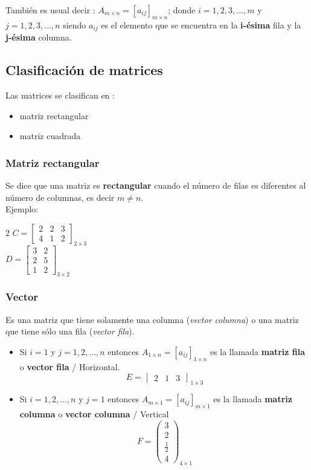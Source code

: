 \documentclass[12pt, a5paper]{article}
\begin{document}
\noindent También es usual decir : {\large $A_{m \times n} = [a_{ij}]_{m \times n}$}; donde $i = 1, 2, 3, \ldots, m$ y $j = 1, 2, 3, \ldots, n$ siendo {\Large $a_{ij}$} es el elemento que se encuentra en la \textbf{i-ésima} fila y la \textbf{j-ésima} columna.

\subsection*{Clasificación de matrices}
\noindent Las matrices se clasifican en : 
\begin{itemize}
\item{matriz rectangular}
\item{matriz cuadrada}
\end{itemize}

\subsubsection*{Matriz rectangular}
\noindent Se dice que una matriz es \textbf{rectangular} cuando el número de filas es diferentes al número de columnas, es decir $m \neq n$. \\

\noindent Ejemplo:

\begin{multicols}{2}
$C = \begin{bmatrix}
2 & 2 & 3 \\
4 & 1 & 2
\end{bmatrix}_{2 \times 3}$ \\

$D = \begin{bmatrix}
3 & 2 \\
2 & 5 \\
1 & 2
\end{bmatrix}_{3 \times 2}$
\end{multicols}

\subsubsection*{Vector}
\noindent Es una matriz que tiene solamente una columna (\textit{vector columna}) o una matriz que tiene sólo una fila (\textit{vector fila}).
\begin{itemize}
\item{Si $i = 1$ y $j = 1, 2, \ldots, n$ entonces {\large $A_{1 \times n} = [a_{ij}]_{1 \times n}$} es la llamada \textbf{matriz fila} o \textbf{vector fila} / Horizontal.
$$
E = \begin{vmatrix}2 & 1 & 3\end{vmatrix}_{1 \times 3}
$$
}
\item{Si $i = 1, 2, \ldots, n$ y $j = 1$ entonces {\large $A_{m \times 1} = [a_{ij}]_{m \times 1}$} es la llamada \textbf{matriz columna} o \textbf{vector columna} / Vertical
$$
F = \begin{pmatrix}
3 \\
2 \\
\frac1{2}\\
4 \end{pmatrix}_{4 \times 1}
$$}
\end{itemize}
\end{document}
